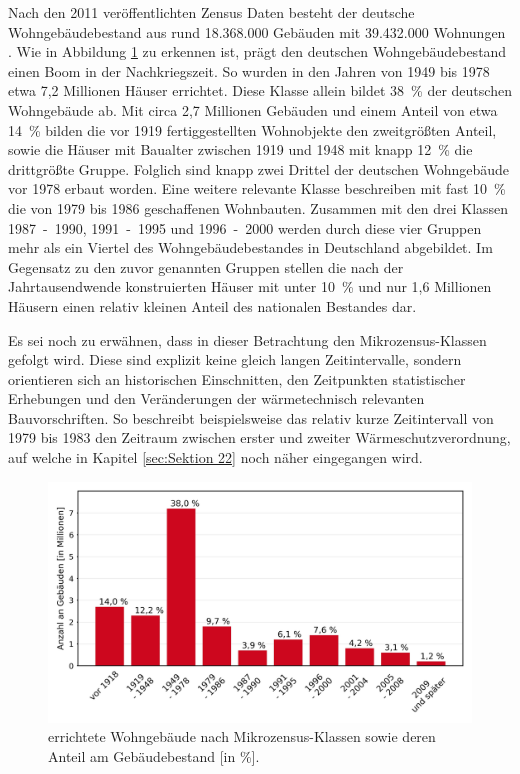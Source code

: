 Nach den 2011 veröffentlichten Zensus Daten besteht der deutsche Wohngebäudebestand aus rund 18.368.000 Gebäuden mit 39.432.000 Wohnungen \cite{.2015}.
Wie in Abbildung \ref{fig: Abbildung211} zu erkennen ist, prägt den deutschen Wohngebäudebestand einen Boom in der Nachkriegszeit. 
So wurden in den Jahren von 1949 bis 1978 etwa 7,2 Millionen Häuser errichtet. Diese Klasse allein bildet \mbox{38 \%} der deutschen Wohngebäude ab. 
Mit circa 2,7 Millionen Gebäuden und einem Anteil von etwa \mbox{14 \%} bilden die vor 1919 fertiggestellten Wohnobjekte den zweitgrößten Anteil, sowie die Häuser mit Baualter zwischen 1919 und 1948 mit knapp \mbox{12 \%} die drittgrößte Gruppe.
Folglich sind knapp zwei Drittel der deutschen Wohngebäude vor 1978 erbaut worden.
Eine weitere relevante Klasse beschreiben mit fast \mbox{10 \%} die von 1979 bis 1986 geschaffenen Wohnbauten. 
Zusammen mit den drei Klassen \mbox{1987 - 1990,} \mbox{1991 - 1995} und \mbox{1996 - 2000} werden  durch diese vier Gruppen mehr als ein Viertel des Wohngebäudebestandes in Deutschland abgebildet.
Im Gegensatz zu den zuvor genannten Gruppen stellen die nach der Jahrtausendwende konstruierten Häuser mit unter \mbox{10 \%} und nur 1,6 Millionen Häusern einen relativ kleinen Anteil des nationalen Bestandes dar. 

Es sei noch zu erwähnen, dass in dieser Betrachtung den Mikrozensus-Klassen gefolgt wird. 
Diese sind explizit keine gleich langen Zeitintervalle, sondern \glqq orientieren sich an historischen Einschnitten, den Zeitpunkten statistischer Erhebungen und den Veränderungen der wärmetechnisch relevanten Bauvorschriften\grqq \cite{.2015}. 
So beschreibt beispielsweise das relativ kurze Zeitintervall von 1979 bis 1983 den Zeitraum zwischen erster und zweiter Wärmeschutzverordnung, auf welche in Kapitel \ref{sec:Sektion 22} noch näher eingegangen wird.

\begin{figure}[H]
	\centering
		\includegraphics{Pictures/GebaeudeAlterDiagramm.jpg}
	\caption{errichtete Wohngebäude nach Mikrozensus-Klassen sowie deren Anteil am Gebäudebestand [in \%].\cite{StatistischeAmterdesBundesundderLander.2014}}
	\label{fig: Abbildung211} 
\end{figure}

